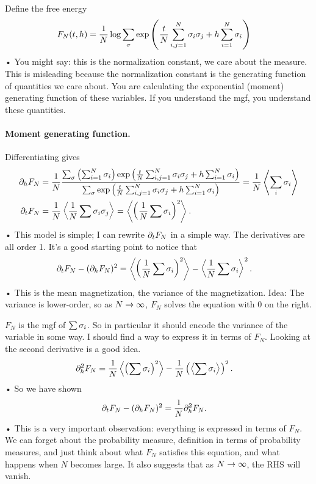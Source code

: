 Define the free energy
\begin{align*}
F_N(t,h) &=\frac{1}{N} \log \sum_\sigma \exp\left( {\frac{t}{N} \sum_{i,j=1}^{N} \sigma_i\sigma_j + h\sum_{i=1}^{N} \sigma_i} \right)
\end{align*}•
You might say: this is the normalization constant, we care about the measure. This is misleading because the normalization constant is the generating function of quantities we care about. You are calculating the exponential (moment) generating function of these variables. If you understand the mgf, you understand these quantities.

\paragraph{Moment generating function.}
Differentiating gives
\begin{align}
\label{e:pd-h}
\partial_h F_N &= \frac{1}{N} \frac{\sum_\sigma \left( {\sum_{i=1}^{N} \sigma_i} \right) \exp\left( {\frac{t}{N} \sum_{i,j=1}^{N} \sigma_i\sigma_j + h\sum_{i=1}^{N} \sigma_i} \right)}{\sum_\sigma \exp\left( {\frac{t}{N} \sum_{i,j=1}^{N} \sigma_i\sigma_j + h\sum_{i=1}^{N} \sigma_i} \right)} = \frac{1}{N} \left\langle {\sum_i \sigma_i}\right\rangle\\
\partial_t F_N &= \frac{1}{N} \left\langle {\frac{1}{N}\sum \sigma_i\sigma_j}\right\rangle 
= \left\langle {\left( {\frac{1}{N} \sum \sigma_i} \right)^2}\right\rangle.
\end{align}•
This model is simple; I can rewrite $\partial_t F_N$ in a simple way. The derivatives are all order 1.
It's a good starting point to notice that
\begin{align*}
\partial_t  F_N - (\partial_hF_N)^2 &= 
\left\langle {\left( {\frac{1}{N} \sum \sigma_i} \right)^2}\right\rangle - \left\langle {\frac{1}{N} \sum \sigma_i}\right\rangle^2.
\end{align*}•
This is the mean magnetization, the variance of the magnetization.
Idea: The variance is lower-order, so as $N\to \infty$, $F_N$ solves the equation with 0 on the right.

$F_N$ is the mgf of $\sum\sigma_i$. So in particular it should encode the variance of the variable in some way. I should find a way to express it in terms of $F_N$. Looking at the second derivative is a good idea.
\begin{align*}
\partial_h^2 F_N &= \frac{1}{N} \left\langle {\left( {\sum \sigma_i} \right)^2}\right\rangle - \frac{1}{N}\left( { \left\langle {\sum \sigma_i}\right\rangle} \right)^2.
\end{align*}•
So we have shown
\begin{align}
\partial_t F_N - (\partial_h F_N)^2 &= \frac{1}{N} \partial_h^2 F_N.
\label{e:pde1}
\end{align}•
This is a very important observation: everything is expressed in terms of $F_N$. We can forget about the probability measure, definition in terms of probability measures, and just think about what $F_N$ satisfies this equation, and what happens when $N$ becomes large. It also suggests that as $N\to \infty$, the RHS will vanish.

